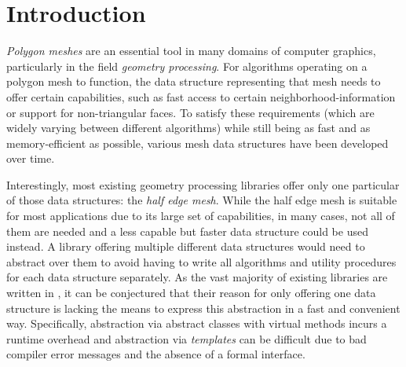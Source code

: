 \chapter{Introduction}



\emph{Polygon meshes} are an essential tool in many domains of computer graphics, particularly in the field \emph{geometry processing}.
For algorithms operating on a polygon mesh to function, the data structure representing that mesh needs to offer certain capabilities, such as fast access to certain neighborhood-information or support for non-triangular faces.
To satisfy these requirements (which are widely varying between different algorithms) while still being as fast and as memory-efficient as possible, various mesh data structures have been developed over time.

Interestingly, most existing geometry processing libraries offer only one particular of those data structures: the \emph{half edge mesh}.
While the half edge mesh is suitable for most applications due to its large set of capabilities, in many cases, not all of them are needed and a less capable but faster data structure could be used instead.
A library offering multiple different data structures would need to abstract over them to avoid having to write all algorithms and utility procedures for each data structure separately.
As the vast majority of existing libraries are written in \cpp, it can be conjectured that their reason for only offering one data structure is \cpp lacking the means to express this abstraction in a fast and convenient way.
Specifically, abstraction via abstract classes with virtual methods incurs a runtime overhead and abstraction via \emph{\cpp templates} can be difficult due to bad compiler error messages and the absence of a formal interface.

